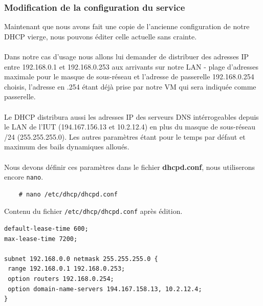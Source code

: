 \documentclass[a4paper]{article}
\begin{document}
\subsubsection{Modification de la configuration du service}
Maintenant que nous avons fait une copie de l'ancienne configuration de notre DHCP vierge, nous pouvons éditer celle actuelle sans crainte.\\\\Dans notre cas d'usage nous allons lui demander de distribuer des adresses IP entre 192.168.0.1 et 192.168.0.253 aux arrivants sur notre LAN - plage d'adresses maximale pour le masque de sous-réseau et l'adresse de passerelle 192.168.0.254 choisis, l'adresse en .254 étant déjà prise par notre VM qui sera indiquée comme passerelle.\\\\Le DHCP distribura aussi les adresses IP des serveurs DNS intérrogeables depuis le LAN de l'IUT (194.167.156.13 et 10.2.12.4) en plus du masque de sous-réseau /24 (255.255.255.0). Les autres paramètres étant pour le temps par défaut et maximum des bails dynamiques alloués.\\\\Nous devons définir ces paramètres dans le fichier \textbf{dhcpd.conf}, nous utiliserons encore \verb|nano|.
\begin{lstlisting}
    # nano /etc/dhcp/dhcpd.conf
\end{lstlisting}
Contenu du fichier \verb|/etc/dhcp/dhcpd.conf| après édition.
\begin{lstlisting}
default-lease-time 600;
max-lease-time 7200;
 
subnet 192.168.0.0 netmask 255.255.255.0 {
 range 192.168.0.1 192.168.0.253;
 option routers 192.168.0.254;
 option domain-name-servers 194.167.158.13, 10.2.12.4;
}
\end{lstlisting}
\end{document}
